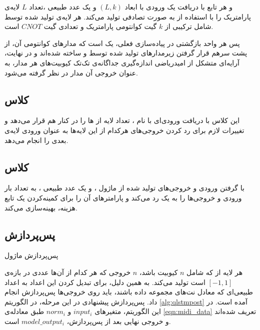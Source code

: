 و هر تابع 
با دریافت یک ورودی با ابعاد
$(L, k)$
و یک عدد طبیعی
،تعداد
$L$
لایه‌ی پارامتریک را با استفاده از
به صورت تصادفی تولید می‌کند.
هر لایه‌ی تولید شده توسط
شامل ترکیبی از 
$k$
گیت کوانتومی پارامتریک و تعدادی گیت 
$CNOT$
است.

پس هر واحد بازگشتی در پیاده‌سازی فعلی، یک
است که مدارهای کوانتومی آن، از پشت سرهم قرار گرفتن زیرمدارهای تولید شده توسط
و
ساخته شده‌اند و در نهایت، آرایه‌ای متشکل از امیدریاضی اندازه‌گیری جداگانه‌ی تک‌تک کیوبیت‌های هر مدار، به عنوان خروجی آن مدار در نظر گرفته می‌شود.

\subsection{
کلاس
}
این کلاس با دریافت ورودی‌ای با نام
،
تعداد
لایه از 
ها را در کنار هم قرار می‌دهد و تغییرات لازم برای رد کردن خروجی‌های هرکدام از این لایه‌ها به عنوان ورودی لایه‌ی بعدی را انجام می‌دهد.

\subsection{
کلاس
}
با گرفتن ورودی و خروجی‌های تولید شده از ماژول
،
و یک عدد طبیعی
،
به تعداد
بار
ورودی و خروجی‌ها را به یک 
رد می‌کند و پارامترهای آن را برای کمینه‌کردن یک تابع هزینه، بهینه‌سازی می‌کند.

\subsection{پس‌پردازش} \label{sec:qlstm_post}
\begin{algorithm}[t]
\caption{پس‌پردازش ماژول }  \label{alg:qlstmpost}
\end{algorithm}
هر لایه از
که شامل
$n$
کیوبیت باشد، 
$n$
خروجی که هر کدام از آن‌ها عددی در بازه‌ی
$[-1, 1]$
است تولید می‌کند. به همین دلیل، برای تبدیل کردن این اعداد به اعداد طبیعی‌ای که معادل نت‌های مجموعه داده باشند، باید روی خروجی‌ها پس‌پردازش انجام داد.
پس‌پردازش پیشنهادی در این مرحله، در الگوریتم
\ref{alg:qlstmpost}
آمده است. در این الگوریتم، متغیرهای
$input_i$
و
$norm_i$
طبق معادله‌ی
\ref{eqn:midi_data}
تعریف شده‌اند و خروجی نهایی بعد از پس‌پردازش،
$model\_output_i$
است.



